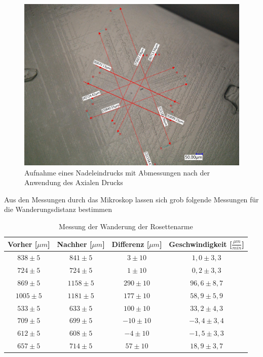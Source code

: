             \begin{figure}[H]
                \centering
                \includegraphics[width=\linewidth]{Images/eriks rosette 1PD Messung.jpg}
                \caption{Aufnahme eines Nadeleindrucks mit Abmessungen nach der Anwendung des Axialen Drucks}
            \end{figure}
            Aus den Messungen durch das Mikroskop lassen sich grob folgende Messungen für die Wanderungsdistanz bestimmen
            \begin{table}[H]
                \centering
                \begin{tabular}[]{c|c|c|c}
                    Vorher [$\mu m$] & Nachher [$\mu m$] & Differenz [$\mu m$] & Geschwindigkeit [$\frac{\mu m}{min}$] \\
                    \hline
                    $838 \pm 5$  & $841 \pm 5$    & $ 3 \pm 10$     & $1,0 \pm 3,3$ \\
                    $724 \pm 5$  & $724 \pm 5$    & $ 1 \pm 10$    & $0,2 \pm 3,3$ \\
                    $869 \pm 5$  & $1158 \pm 5$   & $ 290 \pm 10$  & $96,6 \pm 8,7$\\
                    $1005 \pm 5$ & $1181 \pm 5$   & $ 177 \pm 10$  & $58,9 \pm 5,9$\\
                    $533 \pm 5$  & $633 \pm 5$    & $ 100 \pm 10$    & $33,2 \pm 4,3$\\
                    $709 \pm 5$  & $699 \pm 5$    & $ -10 \pm 10$  & $-3,4 \pm 3,4$\\
                    $612 \pm 5$  & $608 \pm 5$    & $ -4 \pm 10$   & $-1,5 \pm 3,3$\\
                    $657  \pm 5$ & $714  \pm 5$   & $ 57 \pm 10$    & $18,9 \pm 3,7$\\
                \end{tabular}
                \caption{Messung der Wanderung der Rosettenarme}
            \end{table}
